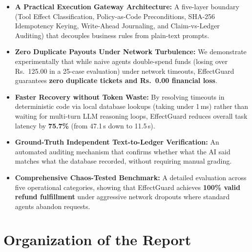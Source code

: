 \begin{itemize}
    \item \textbf{A Practical Execution Gateway Architecture:} A five-layer boundary (Tool Effect Classification, Policy-as-Code Preconditions, SHA-256 Idempotency Keying, Write-Ahead Journaling, and Claim-vs-Ledger Auditing) that decouples business rules from plain-text prompts.
    \item \textbf{Zero Duplicate Payouts Under Network Turbulence:} We demonstrate experimentally that while naive agents double-spend funds (losing over Rs.~125.00 in a 25-case evaluation) under network timeouts, EffectGuard guarantees \textbf{zero duplicate tickets and Rs.~0.00 financial loss}.
    \item \textbf{Faster Recovery without Token Waste:} By resolving timeouts in deterministic code via local database lookups (taking under 1\,ms) rather than waiting for multi-turn LLM reasoning loops, EffectGuard reduces overall task latency by \textbf{75.7\%} (from 47.1\,s down to 11.5\,s).
    \item \textbf{Ground-Truth Independent Text-to-Ledger Verification:} An automated auditing mechanism that confirms whether what the AI said matches what the database recorded, without requiring manual grading.
    \item \textbf{Comprehensive Chaos-Tested Benchmark:} A detailed evaluation across five operational categories, showing that EffectGuard achieves \textbf{100\% valid refund fulfillment} under aggressive network dropouts where standard agents abandon requests.
\end{itemize}

\section{Organization of the Report}

